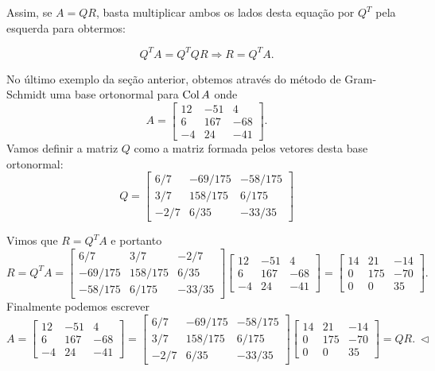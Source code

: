 \documentclass[../livro.tex]{subfiles}  %
\begin{document}
Assim, se $A=QR$, basta multiplicar ambos os lados desta equação por $Q^T$ pela esquerda para obtermos:

$$Q^T A = Q^T Q R  \Longrightarrow R= Q^T A.$$






\vspace{0.3cm}



No último exemplo da seção anterior, obtemos através do método de Gram-Schmidt uma base ortonormal para $\operatorname{Col} A$
onde 
\[
A =
\begin{bmatrix}
12 & -51 & 4 \\
6 & 167 & -68 \\
-4 & 24 & -41
\end{bmatrix}.
\]
Vamos definir a matriz $Q$ como a matriz formada pelos vetores desta base ortonormal:
\[
Q =
\begin{bmatrix}
6/7 & -69/175 & -58/175 \\
3/7 & 158/175 & 6/175   \\
-2/7& 6/35   &-33/35
\end{bmatrix}
\] 

Vimos que $R=Q^T A$ e portanto
\[
R = Q^T A =
\begin{bmatrix}
6/7 & 3/7 & -2/7 \\
-69/175 & 158/175 & 6/35   \\
-58/175& 6/175   &-33/35
\end{bmatrix}
\begin{bmatrix}
12 & -51 & 4 \\
6 & 167 & -68 \\
-4 & 24 & -41
\end{bmatrix} =
\begin{bmatrix}
14&21&-14\\
0&175&-70\\
0&0&35
\end{bmatrix} .
\] 
Finalmente podemos escrever
\[
A =
\begin{bmatrix}
12 & -51 & 4 \\
6 & 167 & -68 \\
-4 & 24 & -41
\end{bmatrix} =
\begin{bmatrix}
6/7 & -69/175 & -58/175 \\
3/7 & 158/175 & 6/175   \\
-2/7& 6/35   &-33/35
\end{bmatrix}
\begin{bmatrix}
14&21&-14\\
0&175&-70\\
0&0&35
\end{bmatrix} = QR. \ \lhd
\]
\end{document}
